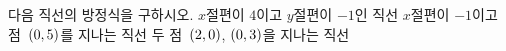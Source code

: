 다음 직선의 방정식을 구하시오.
 $x$절편이 $4$이고 $y$절편이 $-1$인 직선
 $x$절편이 $-1$이고 점~$(0{,}\mkern3mu\mathopen{}5)$를 지나는 직선
 두 점~$(2{,}\mkern3mu\mathopen{}0)$, $(0{,}\mkern3mu\mathopen{}3)$을 지나는 직선

